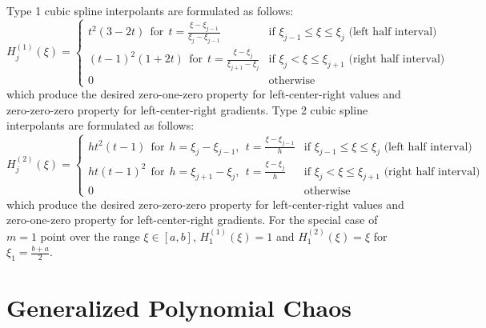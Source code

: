 Type 1 cubic spline interpolants are formulated as follows:
\begin{equation}
H_j^{(1)}(\xi) = 
\begin{cases}
t^2(3-2t) ~~\text{for}~~ t = \frac{\xi-\xi_{j-1}}{\xi_j-\xi_{j-1}} & 
\text{if $\xi_{j-1} \leq \xi \leq \xi_j$ (left half interval)}\\
(t-1)^2(1+2t) ~~\text{for}~~ t = \frac{\xi-\xi_j}{\xi_{j+1}-\xi_j} &
\text{if $\xi_j < \xi \leq \xi_{j+1}$ (right half interval)}\\
0     & \text{otherwise}
\end{cases}
\end{equation}
which produce the desired zero-one-zero property for left-center-right
values and zero-zero-zero property for left-center-right gradients.  
Type 2 cubic spline interpolants are formulated as follows:
\begin{equation}
H_j^{(2)}(\xi) =
\begin{cases}
ht^2(t-1) ~~\text{for}~~ h = \xi_j-\xi_{j-1},~~ t = \frac{\xi-\xi_{j-1}}{h} & 
\text{if $\xi_{j-1} \leq \xi \leq \xi_j$ (left half interval)}\\
ht(t-1)^2 ~~\text{for}~~ h = \xi_{j+1}-\xi_j,~~ t = \frac{\xi-\xi_j}{h} &
\text{if $\xi_j < \xi \leq \xi_{j+1}$ (right half interval)}\\
0     & \text{otherwise}
\end{cases}
\end{equation}
which produce the desired zero-zero-zero property for left-center-right
values and zero-one-zero property for left-center-right gradients.  For 
the special case of $m = 1$ point over the range $\xi \in [a, b]$, 
$H_1^{(1)}(\xi) = 1$ and $H_1^{(2)}(\xi) = \xi$ for $\xi_1 = \frac{b+a}{2}$.



\section{Generalized Polynomial Chaos} \label{uq:expansion:pce}


